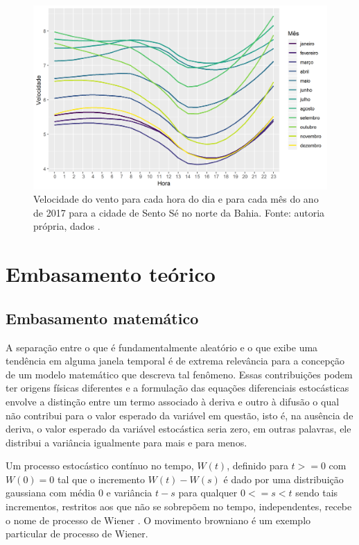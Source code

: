 \documentclass[
	12pt,				%
	openright,			%
	oneside,			%
	a4paper,			%
	english,			%
	french,				%
	spanish,			%
	brazil				%
	]{abntex2}
\begin{document}
\begin{figure}[h]
    \centering
	\includegraphics[width=\textwidth]{diurnal}
	\caption{Velocidade do vento para cada hora do dia e para cada mês do ano de 2017 para a cidade de Sento Sé no norte da Bahia. Fonte: autoria própria, dados \cite{era5}.}
\end{figure}
\FloatBarrier

\part{Embasamento teórico}

\chapter{Embasamento matemático}

A separação entre o que é fundamentalmente aleatório e o que exibe uma tendência em alguma janela temporal é de extrema relevância para a concepção de um modelo matemático que descreva tal fenômeno. Essas contribuições podem ter origens físicas diferentes e a formulação das equações diferenciais estocásticas envolve a distinção entre um termo associado à deriva e outro à difusão o qual não contribui para o valor esperado da variável em questão, isto é, na ausência de deriva, o valor esperado da variável estocástica seria zero, em outras palavras, ele distribui a variância igualmente para mais e para menos.

Um processo estocástico contínuo no tempo, $ W(t) $, definido para $ t>=0 $ com $W(0)=0$ tal que o incremento $ W(t)-W(s)$ é dado por uma distribuição gaussiana com média $0$ e variância $t-s$ para qualquer $ 0<=s<t$ sendo tais incrementos, restritos aos que não se sobrepõem no tempo, independentes, recebe o nome de processo de Wiener \cite{wiener}. O movimento browniano é um exemplo particular de processo de Wiener.
\end{document}
